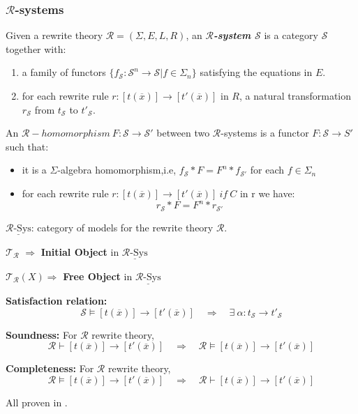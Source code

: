 \documentclass{beamer}
\begin{document}
\begin{frame}
    \frametitle{$\mathcal{R}$-systems}
    \small
    Given a rewrite theory $\mathcal{R} = (\Sigma,E,L,R)$, an \emph{\textbf{$\mathcal{R}$-system $\mathcal{S}$}} is a 
    category $\mathcal{S}$ together with:
    \begin{enumerate}
        \item a family of functors $\{f_\mathcal{S}:\mathcal{S}^n \rightarrow \mathcal{S} | f \in \Sigma_n\}$
        satisfying the equations in $E$.
        \item for each rewrite rule $r:[t(\overline{x})] \rightarrow [t'(\overline{x})]$ in $R$, a natural transformation $r_\mathcal{S}$ from 
        $t_\mathcal{S}$ to $t'_\mathcal{S}$.
    \end{enumerate}

    An $\mathcal{R}-homomorphism\ F: \mathcal{S} \rightarrow \mathcal{S}'$ between two $\mathcal{R}$-systems is a 
    functor $F:\mathcal{S} \rightarrow S'$ such that:
    \begin{itemize}
        \item it is a $\Sigma$-algebra homomorphism,i.e, $f_\mathcal{S}*F = F^n*f_{\mathcal{S}'}$ for each $f \in \Sigma_n$
        \item for each rewrite rule $r:[t(\overline{x})] \rightarrow [t'(\overline{x})]\ if\ C$ in r we have: 
        $$ r_\mathcal{S} * F = F^n * r_{\mathcal{S}'} $$
    \end{itemize}

    \pause
    \bigskip
    $\underline{\mathcal{R}\text{-Sys}}$: category of models for the rewrite theory $\mathcal{R}$. 
\end{frame}
\begin{frame}
  
    \small
    $\mathcal{T_R}$ $\Rightarrow$ \textbf{Initial Object} in $\underline{\mathcal{R}\text{-Sys}}$ 


    \bigskip
    $\mathcal{T_R}(X) \Rightarrow$ \textbf{Free Object} in $\underline{\mathcal{R}\text{-Sys}}$

    \bigskip
    \textbf{Satisfaction relation:} 
    $$\mathcal{S} \models [t(\overline{x})] \rightarrow [t'(\overline{x})]\quad \Rightarrow\quad \exists\  \alpha: t_\mathcal{S} \rightarrow t'_\mathcal{S}$$

    \bigskip
    \textbf{Soundness:} For $\mathcal{R}$ rewrite theory, 
    $$ \mathcal{R} \vdash [t(\overline{x})] \rightarrow [t'(\overline{x})] \quad \Rightarrow\quad \mathcal{R} \models [t(\overline{x})] \rightarrow [t'(\overline{x})]$$

    \bigskip
    \textbf{Completeness:} For $\mathcal{R}$ rewrite theory, 
    $$ \mathcal{R} \models [t(\overline{x})] \rightarrow [t'(\overline{x})] \quad \Rightarrow\quad \mathcal{R} \vdash [t(\overline{x})] \rightarrow [t'(\overline{x})]$$

    \bigskip
    All proven in \cite{meseguer1992conditional}.
\end{frame}
\end{document}

